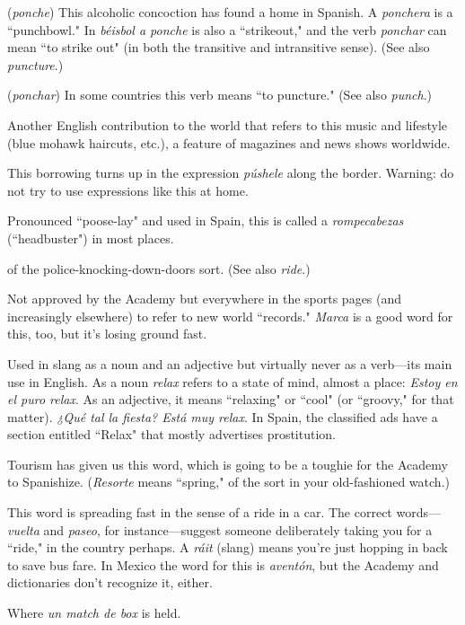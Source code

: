  (\emph{ponche}) This alcoholic concoction has found a home
in Spanish. A \emph{ponchera} is a ``punchbowl." In \emph{béisbol a ponche} is also
a ``strikeout," and the verb \emph{ponchar} can mean ``to strike out" (in both
the transitive and intransitive sense). (See also \emph{puncture}.)

 (\emph{ponchar}) In some countries this verb means ``to
puncture." (See also \emph{punch}.)

 Another English contribution to the world that refers
to this music and lifestyle (blue mohawk haircuts, etc.), a feature of
magazines and news shows worldwide.

 This borrowing turns up in the expression \emph{púshele}
along the border. Warning: do not try to use expressions like this
at home.

 Pronounced ``poose-lay" and used in Spain, this is
called a \emph{rompecabezas} (``headbuster") in most places.

 of the police-knocking-down-doors sort. (See also \emph{ride}.)

 Not approved by the Academy but everywhere in
the sports pages (and increasingly elsewhere) to refer to new world ``records." \emph{Marca} is a good word for this, too, but it's losing ground fast.

 Used in slang as a noun and an adjective but virtually
never as a verb---its main use in English. As a noun \emph{relax} refers to a
state of mind, almost a place: \emph{Estoy en el puro relax}. As an adjective, it
means ``relaxing" or ``cool" (or ``groovy," for that matter). \emph{¿Qué tal la
	fiesta? Está muy relax}. In Spain, the classified ads have a section entitled ``Relax" that mostly advertises prostitution.

 Tourism has given us this word, which is going to
be a toughie for the Academy to Spanishize. (\emph{Resorte} means ``spring,"
of the sort in your old-fashioned watch.)

 This word is spreading fast in the sense of a ride in a
car. The correct words---\emph{vuelta} and \emph{paseo}, for instance---suggest someone deliberately taking you for a ``ride," in the country perhaps. A \emph{ráit}
(slang) means you're just hopping in back to save bus fare. In Mexico
the word for this is \emph{aventón}, but the Academy and dictionaries don't
recognize it, either.

 Where \emph{un match de box} is held.

